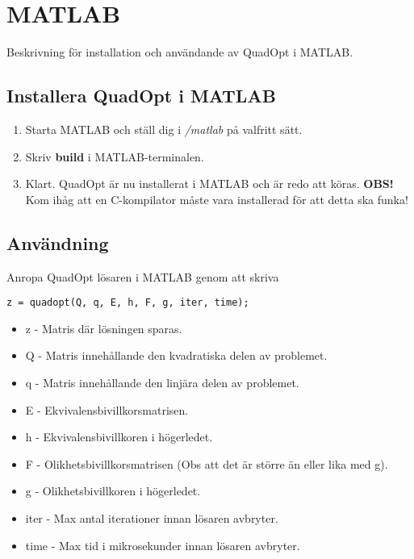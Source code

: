 \section{MATLAB}
Beskrivning för installation och användande av QuadOpt i MATLAB.

\subsection{Installera QuadOpt i MATLAB}
\begin{enumerate}
	\item Starta MATLAB och ställ dig i \emph{/matlab} på valfritt sätt. 
	\item Skriv \textbf{build} i MATLAB-terminalen.
	\item Klart. QuadOpt är nu installerat i MATLAB och är redo att köras.
	\newline
	\newline
	\textbf{OBS!} Kom ihåg att en C-kompilator måste vara installerad för att detta ska funka!
\end{enumerate}

\subsection{Användning}
Anropa QuadOpt lösaren i MATLAB genom att skriva

\begin{lstlisting}
z = quadopt(Q, q, E, h, F, g, iter, time);
\end{lstlisting}

\begin{itemize}
	\item z - Matris där lösningen sparas.
	\item Q - Matris innehållande den kvadratiska delen av problemet.
	\item q - Matris innehållande den linjära delen av problemet.
	\item E - Ekvivalensbivillkorsmatrisen.
	\item h - Ekvivalensbivillkoren i högerledet.
	\item F - Olikhetsbivillkorsmatrisen (Obs att det är större än eller lika med g).
	\item g - Olikhetsbivillkoren i högerledet.
	\item iter - Max antal iterationer innan lösaren avbryter.
	\item time - Max tid i mikrosekunder innan lösaren avbryter.
\end{itemize}
